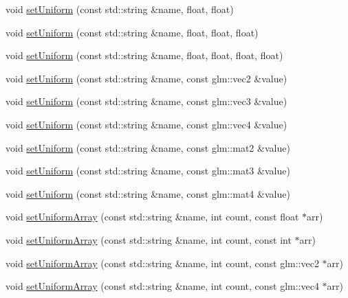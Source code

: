 \begin{DoxyCompactItemize}
\item 
void \hyperlink{classpixel_1_1graphics_1_1_shader_afd8385e261fa898d0431895f041ece5f}{set\+Uniform} (const std\+::string \&name, float, float)
\item 
void \hyperlink{classpixel_1_1graphics_1_1_shader_a28cb04519509cfd8a70d43cd7f23a281}{set\+Uniform} (const std\+::string \&name, float, float, float)
\item 
void \hyperlink{classpixel_1_1graphics_1_1_shader_aedddab6d4cf1a41466c42956c198c8c3}{set\+Uniform} (const std\+::string \&name, float, float, float, float)
\item 
void \hyperlink{classpixel_1_1graphics_1_1_shader_a0959f6d331145ad2d062b9d379be3a08}{set\+Uniform} (const std\+::string \&name, const glm\+::vec2 \&value)
\item 
void \hyperlink{classpixel_1_1graphics_1_1_shader_ad840ffba069289622bf3c6cd70727671}{set\+Uniform} (const std\+::string \&name, const glm\+::vec3 \&value)
\item 
void \hyperlink{classpixel_1_1graphics_1_1_shader_ad6cf7896a1994a28741df557237b1180}{set\+Uniform} (const std\+::string \&name, const glm\+::vec4 \&value)
\item 
void \hyperlink{classpixel_1_1graphics_1_1_shader_addce0cb5dcfbbe52884655ad8018dff2}{set\+Uniform} (const std\+::string \&name, const glm\+::mat2 \&value)
\item 
void \hyperlink{classpixel_1_1graphics_1_1_shader_a4d709597587eabc4943d503e11a6f82d}{set\+Uniform} (const std\+::string \&name, const glm\+::mat3 \&value)
\item 
void \hyperlink{classpixel_1_1graphics_1_1_shader_a3de51e0fa06c12ce4972b69bb145185b}{set\+Uniform} (const std\+::string \&name, const glm\+::mat4 \&value)
\item 
void \hyperlink{classpixel_1_1graphics_1_1_shader_a0ebb64562d0a42d2702e91f769331142}{set\+Uniform\+Array} (const std\+::string \&name, int count, const float $\ast$arr)
\item 
void \hyperlink{classpixel_1_1graphics_1_1_shader_acbd13afb6e7af01f52f2f02a15977c2a}{set\+Uniform\+Array} (const std\+::string \&name, int count, const int $\ast$arr)
\item 
void \hyperlink{classpixel_1_1graphics_1_1_shader_a762d7c687637815d53983d0e2d4a2e5d}{set\+Uniform\+Array} (const std\+::string \&name, int count, const glm\+::vec2 $\ast$arr)
\item 
void \hyperlink{classpixel_1_1graphics_1_1_shader_a9a0df22818674e58c4946cc2f72db94c}{set\+Uniform\+Array} (const std\+::string \&name, int count, const glm\+::vec4 $\ast$arr)

\end{DoxyCompactItemize}
